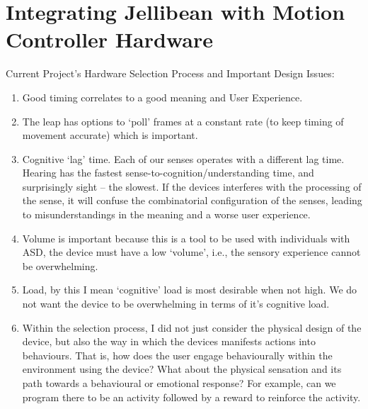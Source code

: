 \documentclass[a4paper, 11pt]{article}
\begin{document}
\section{Integrating Jellibean with Motion Controller Hardware}
Current Project’s Hardware Selection Process and Important Design Issues:
\begin{enumerate}
\item{Good timing correlates to a good meaning and User Experience.}
\item{The leap has options to ‘poll’ frames at a constant rate (to keep timing of movement accurate) which is important.}
\item{Cognitive ‘lag’ time. Each of our senses operates with a different lag time. Hearing has the fastest sense-to-cognition/understanding time, and surprisingly sight -- the slowest. If the devices interferes with the processing of the sense, it will confuse the combinatorial configuration of the senses, leading to misunderstandings in the meaning and a worse user experience.}
\item{Volume is important because this is a tool to be used with individuals with ASD, the device must have a low `volume’, i.e., the sensory experience cannot be overwhelming.}
\item{Load, by this I mean `cognitive' load is most desirable when not high. We do not want the device to be overwhelming in terms of it’s cognitive load.}
\item{Within the selection process, I did not just consider the physical design of the device, but also the way in which the devices manifests actions into behaviours. That is, how does the user engage behaviourally within the environment using the device? What about the physical sensation and its path towards a behavioural or emotional response? For example, can we program there to be an activity followed by a reward to reinforce the activity.}
\end{enumerate}	
\end{document}

